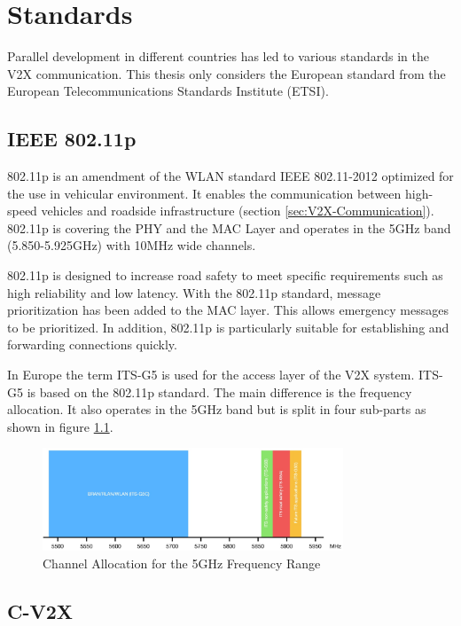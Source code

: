\chapter{Standards} \label{ch:standarts}

Parallel development in different countries has led to various standards in the V2X communication. This thesis only considers the European standard from the European Telecommunications Standards Institute (ETSI). 

\section{IEEE 802.11p}

802.11p is an amendment of the WLAN standard IEEE 802.11-2012 optimized for the use in vehicular environment. It enables the communication between high-speed vehicles and roadside infrastructure (section \ref{sec:V2X-Communication}). 802.11p is covering the PHY and the MAC Layer and operates in the 5\;GHz band (5.850-5.925\;GHz) with 10\;MHz wide channels. \cite{IEEE802.11p}

802.11p is designed to increase road safety to meet specific requirements such as high reliability and low latency. With the 802.11p standard, message prioritization has been added to the MAC layer. This allows emergency messages to be prioritized. In addition, 802.11p is particularly suitable for establishing and forwarding connections quickly. \cite{Mustafa}

In Europe the term ITS-G5 is used for the access layer of the V2X system. ITS-G5 is based on the 802.11p standard. The main difference is the frequency allocation. It also operates in the 5\;GHz band but is split in four sub-parts as shown in figure \ref{fig:alloc}. \cite{ETSI_EN_302_663}


\begin{figure}[htb]
	\centering
	\includegraphics[width=0.8\textwidth]{images/f_allocation}
	\caption{Channel Allocation for the 5\;GHz Frequency Range}
	\label{fig:alloc}
\end{figure}

\section{C-V2X}

